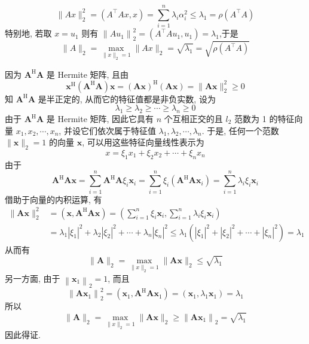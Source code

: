 $$\|A x\|_{2}^{2}=\left(A^{\top} A x , x\right)=\sum_{i=1}^{n} 
\lambda_{i} \alpha_{i}^{2} \leqslant \lambda_{1}=\rho\left(A^{\top} A\right)
$$
特别地, 若取 $ x=u_{1} $ 则有 $ \left\|A u_{1}\right\|_{2}^{2}=\left(A^{\top} A u_{1}, u_{1}\right)=\lambda_{1} $,于是 
$$\|A\|_{2}=\max _{\|x\|_{2}=1}\|A x\|_{2}=\sqrt{\lambda_{1}}=\sqrt{\rho\left(A^{\top} A\right)} $$

\begin{tcolorbox}
因为 $ \boldsymbol{A}^{\mathrm{H}} \boldsymbol{A} $ 是 Hermite 矩阵, 且由
$$
\boldsymbol{x}^{\mathrm{H}}\left(\boldsymbol{A}^{\mathrm{H}} \boldsymbol{A}\right) \boldsymbol{x}=(\boldsymbol{A} \boldsymbol{x})^{\mathrm{H}}(\boldsymbol{A x})=\|\boldsymbol{A} \boldsymbol{x}\|_{2}^{2} \geqslant 0
$$
知 $ \boldsymbol{A}^{\mathrm{H}} \boldsymbol{A} $ 是半正定的, 从而它的特征值都是非负实数, 设为
$$
\lambda_{1} \geqslant \lambda_{2} \geqslant \cdots \geqslant \lambda_{n} \geqslant 0
$$
由于 $ \boldsymbol{A}^{\mathrm{H}} \boldsymbol{A} $ 是 Hermite 矩阵, 因此它具有 $ n $ 个互相正交的且 $ l_{2} $ 范数为 1 的特征向量 $ x_{1}, x_{2}, \cdots, x_{n} $, 并设它们依次属于特征值 $ \lambda_{1}, \lambda_{2}, \cdots, \lambda_{n} $. 于是, 任何一个范数 $ \|\boldsymbol{x}\|_{2}=1 $ 的向量 $ \boldsymbol{x} $, 可以用这些特征向量线性表示为
$$
x=\xi_{1} x_{1}+\xi_{2} x_{2}+\cdots+\xi_{n} x_{n}
$$
由于
$$
\boldsymbol{A}^{\mathrm{H}} \boldsymbol{A} \boldsymbol{x}=\sum_{i=1}^{n} \boldsymbol{A}^{\mathrm{H}} \boldsymbol{A} \xi_{i} \boldsymbol{x}_{i}=\sum_{i=1}^{n} \xi_{i}\left(\boldsymbol{A}^{\mathrm{H}} \boldsymbol{A} \boldsymbol{x}_{i}\right)=\sum_{i=1}^{n} \lambda_{i} \xi_{i} \boldsymbol{x}_{i}
$$
借助于向量的内积运算, 有
$$
\begin{aligned}
\|\boldsymbol{A} \boldsymbol{x}\|_{2}^{2}&= \left(\boldsymbol{x}, \boldsymbol{A}^{\mathrm{H}} \boldsymbol{A} \boldsymbol{x}\right)=\left(\sum_{i=1}^{n} \xi_{i} \boldsymbol{x}_{i}, \sum_{i=1}^{n} \lambda_{i} \xi_{i} \boldsymbol{x}_{i}\right) \\
& =\lambda_{1}\left|\xi_{1}\right|^{2}+\lambda_{2}\left|\xi_{2}\right|^{2}+\cdots+\lambda_{n}\left|\xi_{n}\right|^{2} \leqslant  \lambda_{1}\left(\left|\xi_{1}\right|^{2}+\left|\xi_{2}\right|^{2}+\cdots+\left|\xi_{n}\right|^{2}\right)=\lambda_{1}
\end{aligned}
$$
从而有
$$
\|\boldsymbol{A}\|_{2}=\max _{\|x\|_{2}=1}\|\boldsymbol{A} \boldsymbol{x}\|_{2} \leqslant \sqrt{\lambda_{1}}
$$
另一方面, 由于 $ \left\|\boldsymbol{x}_{1}\right\|_{2}=1 $, 而且
$$
\left\|\boldsymbol{A} \boldsymbol{x}_{1}\right\|_{2}^{2}=\left(\boldsymbol{x}_{1}, \boldsymbol{A}^{\mathrm{H}} \boldsymbol{A} \boldsymbol{x}_{1}\right)=\left(\boldsymbol{x}_{1}, \lambda_{1} \boldsymbol{x}_{1}\right)=\lambda_{1}
$$
所以
$$
\|\boldsymbol{A}\|_{2}=\max _{\|x\|_{2}=1}\|\boldsymbol{A} \boldsymbol{x}\|_{2} \geqslant\left\|\boldsymbol{A} \boldsymbol{x}_{1}\right\|_{2}=\sqrt{\lambda_{1}}
$$
因此得证.
\end{tcolorbox}